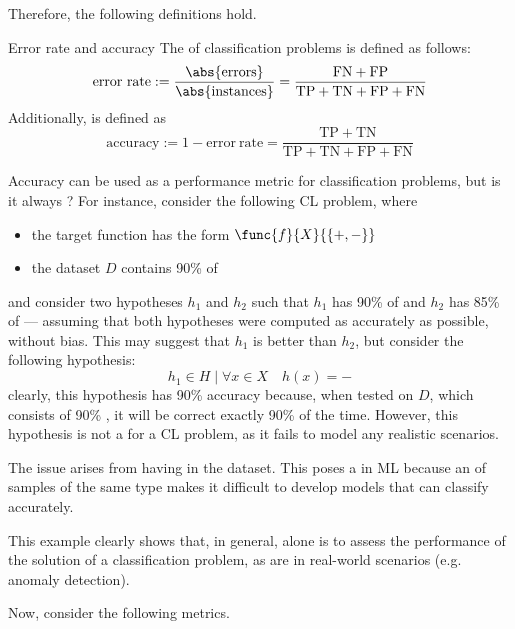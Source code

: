 \documentclass[a4paper, 12pt]{report}
\begin{document}
    Therefore, the following definitions hold.

    \begin{frameddefn}{Error rate and accuracy}
        The  of classification problems is defined as follows: $$\mathrm{error \ rate} := \dfrac{\abs{\mathrm{errors}}}{\abs{\mathrm{instances}}} = \dfrac{\mathrm{FN} + \mathrm{FP}}{\mathrm{TP} + \mathrm{TN} + \mathrm{FP} + \mathrm{FN}}$$ Additionally,  is defined as $$\mathrm{accuracy} := 1 - \mathrm{error \ rate} = \dfrac{\mathrm{TP} + \mathrm{TN}}{\mathrm{TP} + \mathrm{TN} + \mathrm{FP} + \mathrm{FN}}$$
    \end{frameddefn}

    Accuracy can be used as a performance metric for classification problems, but is it always ? For instance, consider the following CL problem, where

    \begin{itemize}
        \item the target function has the form $\func{f}{X}{\{+, -\}}$
        \item the dataset $D$ contains 90\% of 
    \end{itemize}
    
    and consider two hypotheses $h_1$ and $h_2$ such that $h_1$ has 90\% of  and $h_2$ has 85\% of  --- assuming that both hypotheses were computed as accurately as possible, without bias. This may suggest that $h_1$ is better than $h_2$, but consider the following hypothesis: $$h_1 \in H \mid \forall x \in X \quad h(x) = -$$ clearly, this hypothesis has 90\% accuracy because, when tested on $D$, which consists of 90\% , it will be correct exactly 90\% of the time. However, this hypothesis is not a  for a CL problem, as it fails to model any realistic scenarios.

    The issue arises from having   in the dataset. This poses a  in ML because an  of samples of the same type makes it difficult to develop models that can classify accurately.

    This example clearly shows that, in general,  alone is  to assess the performance of the solution of a classification problem, as  are  in real-world scenarios (e.g. anomaly detection).

    Now, consider the following metrics.
\end{document}
